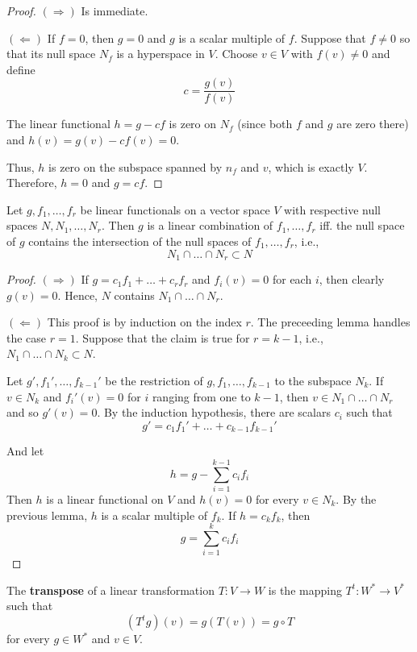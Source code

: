 \begin{proof}
	$(\Rightarrow)$ Is immediate.

	$(\Leftarrow)$ If $f = 0$, then $g = 0$ and $g$ is a scalar multiple of $f$. Suppose that $f \neq 0$ so that its null space $N_f$ is a hyperspace in $V$. Choose $v \in V$ with $f(v) \neq 0$ and define
	\[
		c = \frac{g(v)}{f(v)}
	\]

	The linear functional $h = g - cf$ is zero on $N_f$ (since both $f$ and $g$ are zero there) and $h(v) = g(v) - cf(v) = 0$.

	Thus, $h$ is zero on the subspace spanned by $n_f$ and $v$, which is exactly $V$. Therefore, $h = 0$ and $g = cf$.
\end{proof}

\begin{theorem}
	Let $g, f_1, \ldots, f_r$ be linear functionals on a vector space $V$ with respective null spaces $N, N_1, \ldots, N_r$. Then $g$ is a linear combination of $f_1, \ldots, f_r$ iff. the null space of $g$ contains the intersection of the null spaces of $f_1, \ldots, f_r$, i.e.,
	\[
		N_1 \cap \ldots \cap N_r \subset N
	\]
\end{theorem}

\begin{proof}
	$(\Rightarrow)$ If $g = c_1 f_1 + \ldots + c_r f_r$ and $f_i(v) = 0$ for each $i$, then clearly $g(v) = 0$. Hence, $N$ contains $N_1 \cap \ldots \cap N_r$.

	$(\Leftarrow)$ This proof is by induction on the index $r$. The preceeding lemma handles the case $r = 1$. Suppose that the claim is true for $r = k-1$, i.e., $N_1 \cap \ldots \cap N_k \subset N$. 

	Let $g', f_1', \ldots, f_{k-1}'$ be the restriction of $g, f_1, \ldots, f_{k-1}$ to the subspace $N_k$. If $v \in N_k$ and $f_i'(v) = 0$ for $i$ ranging from one to $k-1$, then $v \in N_1 \cap \ldots \cap N_r$ and so $g'(v) = 0$. By the induction hypothesis, there are scalars $c_i$ such that
	\[
		g' = c_1 f_1' + \ldots + c_{k-1} f_{k-1}'
	\]

	And let 
	\[
		h = g - \sum_{i=1}^{k-1} c_i f_i
	\]
	Then $h$ is a linear functional on $V$ and $h(v) = 0$ for every $v \in N_k$. By the previous lemma, $h$ is a scalar multiple of $f_k$. If $h = c_k f_k$, then 
	\[
		g = \sum_{i=1}^k c_i f_i
	\]
\end{proof}

\begin{definition}[Transpose]
	The \textbf{transpose} of a linear transformation $T : V \longrightarrow W$ is the mapping 	$T^t : W^\ast \longrightarrow V^\ast$ such that
	\[
		(T^tg)(v) = g(T(v)) = g \circ T
	\]
	for every $g \in W^\ast$ and $v \in V$.
\end{definition}

